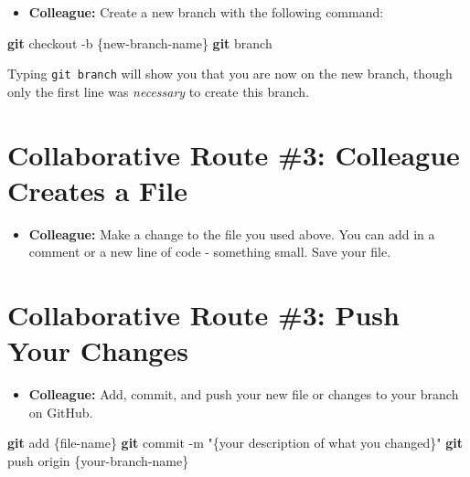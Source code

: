 \documentclass[
]{book}
\newenvironment{Shaded}{\begin{snugshade}}{\end{snugshade}}
\newcommand{\AttributeTok}[1]{\textcolor[rgb]{0.13,0.29,0.53}{#1}}
\newcommand{\FunctionTok}[1]{\textcolor[rgb]{0.13,0.29,0.53}{\textbf{#1}}}
\newcommand{\NormalTok}[1]{#1}
\newcommand{\StringTok}[1]{\textcolor[rgb]{0.31,0.60,0.02}{#1}}
\providecommand{\tightlist}{%
  \setlength{\itemsep}{0pt}\setlength{\parskip}{0pt}}
\begin{document}
\begin{itemize}
\tightlist
\item
  \textbf{Colleague:} Create a new branch with the following command:
\end{itemize}

\begin{Shaded}
\begin{Highlighting}[]
\FunctionTok{git}\NormalTok{ checkout }\AttributeTok{{-}b}\NormalTok{ \{new{-}branch{-}name\}}
\FunctionTok{git}\NormalTok{ branch}
\end{Highlighting}
\end{Shaded}

Typing \texttt{git\ branch} will show you that you are now on the new branch, though only the first line was \emph{necessary} to create this branch.

\hypertarget{collaborative-route-3-colleague-creates-a-file}{%
\section{Collaborative Route \#3: Colleague Creates a File}\label{collaborative-route-3-colleague-creates-a-file}}

\begin{itemize}
\tightlist
\item
  \textbf{Colleague:} Make a change to the file you used above. You can add in a comment or a new line of code - something small. Save your file.
\end{itemize}

\hypertarget{collaborative-route-3-push-your-changes}{%
\section{Collaborative Route \#3: Push Your Changes}\label{collaborative-route-3-push-your-changes}}

\begin{itemize}
\tightlist
\item
  \textbf{Colleague:} Add, commit, and push your new file or changes to your branch on GitHub.
\end{itemize}

\begin{Shaded}
\begin{Highlighting}[]
\FunctionTok{git}\NormalTok{ add \{file{-}name\}}
\FunctionTok{git}\NormalTok{ commit }\AttributeTok{{-}m} \StringTok{"\{your description of what you changed\}"}
\FunctionTok{git}\NormalTok{ push origin \{your{-}branch{-}name\}}
\end{Highlighting}
\end{Shaded}
\end{document}
